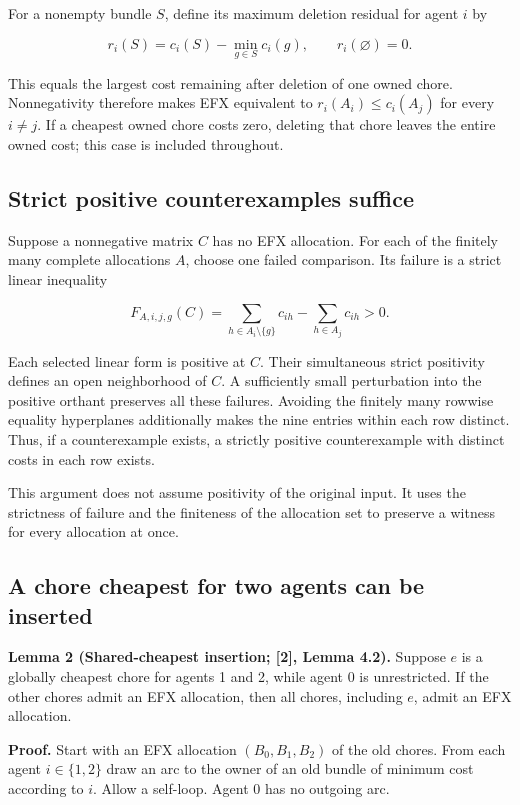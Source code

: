 \documentclass[
  11pt,
]{article}
\newcounter{none} %
\begin{document}
For a nonempty bundle \(S\), define its maximum deletion residual for
agent \(i\) by

\[
r_i(S)=c_i(S)-\min_{g\in S}c_i(g),
\qquad r_i(\varnothing)=0.
\]

This equals the largest cost remaining after deletion of one owned
chore. Nonnegativity therefore makes EFX equivalent to
\(r_i(A_i)\le c_i(A_j)\) for every \(i\ne j\). If a cheapest owned chore
costs zero, deleting that chore leaves the entire owned cost; this case
is included throughout.

\subsection{Strict positive counterexamples
suffice}\label{strict-positive-counterexamples-suffice}

Suppose a nonnegative matrix \(C\) has no EFX allocation. For each of
the finitely many complete allocations \(A\), choose one failed
comparison. Its failure is a strict linear inequality

\[
F_{A,i,j,g}(C)=\sum_{h\in A_i\setminus\{g\}}c_{ih}
                 -\sum_{h\in A_j}c_{ih}>0.
\]

Each selected linear form is positive at \(C\). Their simultaneous
strict positivity defines an open neighborhood of \(C\). A sufficiently
small perturbation into the positive orthant preserves all these
failures. Avoiding the finitely many rowwise equality hyperplanes
additionally makes the nine entries within each row distinct. Thus, if a
counterexample exists, a strictly positive counterexample with distinct
costs in each row exists.

This argument does not assume positivity of the original input. It uses
the strictness of failure and the finiteness of the allocation set to
preserve a witness for every allocation at once.

\subsection{A chore cheapest for two agents can be
inserted}\label{a-chore-cheapest-for-two-agents-can-be-inserted}

\textbf{Lemma 2 (Shared-cheapest insertion; {[}2{]}, Lemma 4.2).}
Suppose \(e\) is a globally cheapest chore for agents 1 and 2, while
agent 0 is unrestricted. If the other chores admit an EFX allocation,
then all chores, including \(e\), admit an EFX allocation.

\textbf{Proof.} Start with an EFX allocation \((B_0,B_1,B_2)\) of the
old chores. From each agent \(i\in\{1,2\}\) draw an arc to the owner of
an old bundle of minimum cost according to \(i\). Allow a self-loop.
Agent 0 has no outgoing arc.
\end{document}
